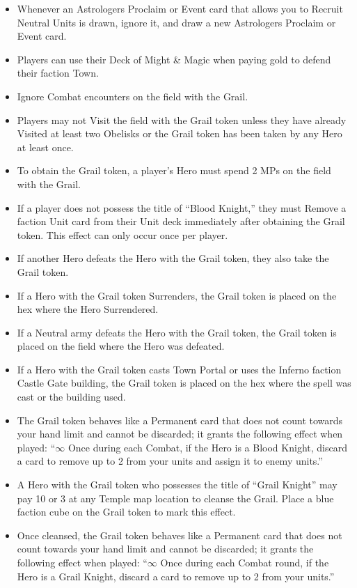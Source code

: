 \begin{multicols*}{2}
\begin{itemize}
    \item Whenever an Astrologers Proclaim or Event card that allows you to Recruit Neutral Units is drawn, ignore it, and draw a new Astrologers Proclaim or Event card.
    \item Players can use their Deck of Might \& Magic when paying gold to defend their faction Town.
    \item Ignore Combat encounters on the field with the Grail.
    \item Players may not Visit the field with the Grail token unless they have already Visited at least two Obelisks or the Grail token has been taken by any Hero at least once.
    \item To obtain the Grail token, a player’s Hero must spend 2 MPs on the field with the Grail.
    \item If a player does not possess the title of ``\textcolor{darkcandyapplered}{Blood Knight},'' they must Remove a faction Unit card from their Unit deck immediately after obtaining the Grail token. This effect can only occur once per player.
    \item If another Hero defeats the Hero with the Grail token, they also take the Grail token.
    \item If a Hero with the Grail token Surrenders, the Grail token is placed on the hex where the Hero Surrendered.
    \item If a Neutral army defeats the Hero with the Grail token, the Grail token is placed on the field where the Hero was defeated.
    \item If a Hero with the Grail token casts Town Portal or uses the Inferno faction Castle Gate building, the Grail token is placed on the hex where the spell was cast or the building used.
    \item The Grail token behaves like a Permanent card that does not count towards your hand limit and cannot be discarded; it grants the following effect when played: ``$\infty$ Once during each Combat, if the Hero is a \textcolor{darkcandyapplered}{Blood Knight}, discard a card to remove up to 2  from your units and assign it to enemy units.''
    \item A Hero with the Grail token who possesses the title of ``\textcolor{darkcerulean}{Grail Knight}'' may pay 10  or 3  at any Temple map location to cleanse the Grail. Place a blue faction cube on the Grail token to mark this effect.
    \item Once cleansed, the Grail token behaves like a Permanent card that does not count towards your hand limit and cannot be discarded; it grants the following effect when played: ``$\infty$ Once during each Combat round, if the Hero is a \textcolor{darkcerulean}{Grail Knight}, discard a card to remove up to 2  from your units.''
\end{itemize}


\end{multicols*}
